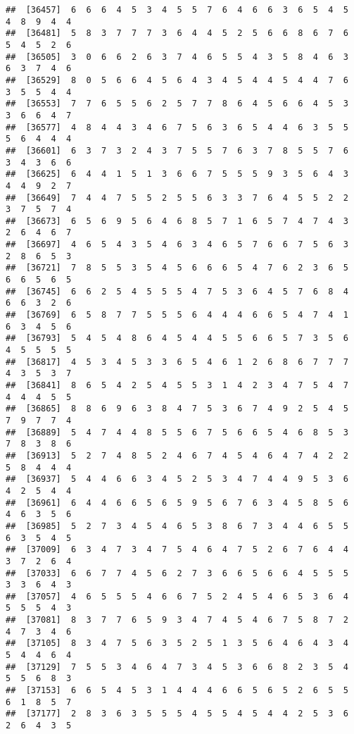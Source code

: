 \documentclass[
]{book}
\begin{document}
\begin{verbatim}
##  [36457]  6  6  6  4  5  3  4  5  5  7  6  4  6  6  3  6  5  4  5  4  8  9  4  4
##  [36481]  5  8  3  7  7  7  3  6  4  4  5  2  5  6  6  8  6  7  6  5  4  5  2  6
##  [36505]  3  0  6  6  2  6  3  7  4  6  5  5  4  3  5  8  4  6  3  6  3  7  4  6
##  [36529]  8  0  5  6  6  4  5  6  4  3  4  5  4  4  5  4  4  7  6  3  5  5  4  4
##  [36553]  7  7  6  5  5  6  2  5  7  7  8  6  4  5  6  6  4  5  3  3  6  6  4  7
##  [36577]  4  8  4  4  3  4  6  7  5  6  3  6  5  4  4  6  3  5  5  5  6  4  4  4
##  [36601]  6  3  7  3  2  4  3  7  5  5  7  6  3  7  8  5  5  7  6  3  4  3  6  6
##  [36625]  6  4  4  1  5  1  3  6  6  7  5  5  5  9  3  5  6  4  3  4  4  9  2  7
##  [36649]  7  4  4  7  5  5  2  5  5  6  3  3  7  6  4  5  5  2  2  3  7  5  7  4
##  [36673]  6  5  6  9  5  6  4  6  8  5  7  1  6  5  7  4  7  4  3  2  6  4  6  7
##  [36697]  4  6  5  4  3  5  4  6  3  4  6  5  7  6  6  7  5  6  3  2  8  6  5  3
##  [36721]  7  8  5  5  3  5  4  5  6  6  6  5  4  7  6  2  3  6  5  6  6  5  6  5
##  [36745]  6  6  2  5  4  5  5  5  4  7  5  3  6  4  5  7  6  8  4  6  6  3  2  6
##  [36769]  6  5  8  7  7  5  5  5  6  4  4  4  6  6  5  4  7  4  1  6  3  4  5  6
##  [36793]  5  4  5  4  8  6  4  5  4  4  5  5  6  6  5  7  3  5  6  4  5  5  5  5
##  [36817]  4  5  3  4  5  3  3  6  5  4  6  1  2  6  8  6  7  7  7  4  3  5  3  7
##  [36841]  8  6  5  4  2  5  4  5  5  3  1  4  2  3  4  7  5  4  7  4  4  4  5  5
##  [36865]  8  8  6  9  6  3  8  4  7  5  3  6  7  4  9  2  5  4  5  7  9  7  7  4
##  [36889]  5  4  7  4  4  8  5  5  6  7  5  6  6  5  4  6  8  5  3  7  8  3  8  6
##  [36913]  5  2  7  4  8  5  2  4  6  7  4  5  4  6  4  7  4  2  2  5  8  4  4  4
##  [36937]  5  4  4  6  6  3  4  5  2  5  3  4  7  4  4  9  5  3  6  4  2  5  4  4
##  [36961]  6  4  4  6  6  5  6  5  9  5  6  7  6  3  4  5  8  5  6  4  6  3  5  6
##  [36985]  5  2  7  3  4  5  4  6  5  3  8  6  7  3  4  4  6  5  5  6  3  5  4  5
##  [37009]  6  3  4  7  3  4  7  5  4  6  4  7  5  2  6  7  6  4  4  3  7  2  6  4
##  [37033]  6  6  7  7  4  5  6  2  7  3  6  6  5  6  6  4  5  5  5  3  3  6  4  3
##  [37057]  4  6  5  5  5  4  6  6  7  5  2  4  5  4  6  5  3  6  4  5  5  5  4  3
##  [37081]  8  3  7  7  6  5  9  3  4  7  4  5  4  6  7  5  8  7  2  4  7  3  4  6
##  [37105]  8  3  4  7  5  6  3  5  2  5  1  3  5  6  4  6  4  3  4  5  4  4  6  4
##  [37129]  7  5  5  3  4  6  4  7  3  4  5  3  6  6  8  2  3  5  4  5  5  6  8  3
##  [37153]  6  6  5  4  5  3  1  4  4  4  6  6  5  6  5  2  6  5  5  6  1  8  5  7
##  [37177]  2  8  3  6  3  5  5  5  4  5  5  4  5  4  4  2  5  3  6  2  6  4  3  5

\end{verbatim}
\end{document}
